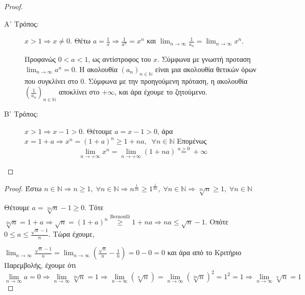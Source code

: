 \documentclass[main.tex]{subfiles}
\begin{document}
\begin{proof}
\item {}
    \begin{description}
        \item [Α᾽ Τρόπος:]
            $ x >1 \Rightarrow x \neq 0 $. Θέτω  $a = \frac{1}{x} \Rightarrow 
            \frac{1}{a^{n}} = x^{n} $ και $ \lim_{n \to \infty} \frac{1}{a_{n}} = 
            \lim_{n \to \infty}x^{n}$. 


            Προφανώς $ 0 < a <1 $, ως αντίστροφος του $x$. Σύμφωνα με γνωστή προταση
            $ \lim_{n \to \infty} a^{n} = 0 $. Η ακολουθία $ (a_{n})_{n \in \mathbb{N}}
            $ είναι μια ακολουθία θετικών όρων που συγκλίνει στο 0. Σύμφωνα με 
            την προηγούμενη πρόταση, η ακολουθία $ \left(\frac{1}{a_{n}}\right)_{n 
            \in \mathbb{N}} $ αποκλίνει στο $ + \infty $, και άρα έχουμε το ζητούμενο.
        \item [Β᾽ Τρόπος:]
            $ x>1 \Rightarrow x-1>0 $. Θέτουμε $ a = x-1>0 $, άρα $ x = 1+a 
            \Rightarrow x^{n} = (1+a)^{n} \geq 1+na, \; \; \forall n \in \mathbb{N} $ 
            Επομένως 
            \[
                \lim_{n \to +\infty} x^{n} = \lim_{n \to +\infty} (1+na) 
                \overset{a>0}{=} +\infty 
            \]
    \end{description}
\end{proof}



\begin{proof}
    Έστω $ n \in \mathbb{N} \Rightarrow n \geq 1, \; \forall n \in 
    \mathbb{N} \Rightarrow n ^{\frac{1}{2n}} \geq 1^{\frac{1}{2n}}, \; 
    \forall n \in \mathbb{N} \Rightarrow \sqrt[2n]{n} \geq 1, \; \forall n 
    \in \mathbb{N} $

    Θέτουμε $ a = \sqrt[2n]{n} -1 \geq 0 $. Τότε $ \sqrt[2n]{n} = 1 + a 
    \Rightarrow \sqrt{n} = (1+a)^{n} \overset{\text{Bernoulli}}{\geq} 1 
    + na \Rightarrow na \leq \sqrt{n} - 1  $. Οπότε $ 0 \leq a \leq
    \frac{\sqrt{n} -1}{n} $. Τώρα έχουμε, 

    $ \lim_{n \to \infty} \frac{\sqrt{n} -1}{n} = \lim_{n \to \infty} 
    \left( \frac{\sqrt{n}}{n} - \frac{1}{n}\right) = 0 - 0 = 0 $ και 
    άρα από το Κριτήριο Παρεμβολής, έχουμε ότι \[ \lim_{n \to \infty} a = 0 
    \Rightarrow \lim_{n \to \infty} \sqrt[2n]{n} = 1 \Rightarrow \lim_{n \to
    \infty} (\sqrt[n]{n}) = \lim_{n \to \infty} (\sqrt[2n]{n})^{2} =  
    1^{2} = 1 \Rightarrow \lim_{n \to \infty} \sqrt[n]{n} =1 \]
\end{proof}
\end{document}
